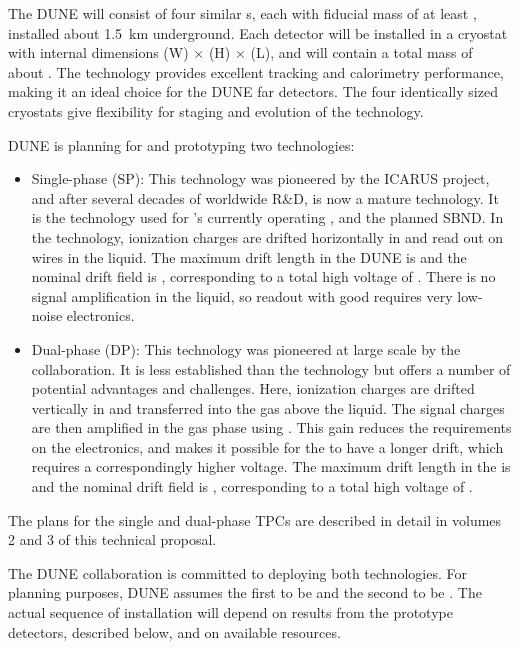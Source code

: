 The DUNE  will consist of four similar \lartpc{}s, each with fiducial mass of at least \nominalmodsize, installed about \SI{1.5}{km} underground. Each detector will be installed in a cryostat with internal dimensions
\cryostatwdth (W) $\times$ \cryostatht (H) $\times$ \cryostatlen (L), and will contain a total \lar{} mass of about \larmass{}.
The \lartpc technology provides
excellent tracking and calorimetry performance, making it an ideal
choice for the DUNE far detectors. The four identically sized cryostats give flexibility for staging and evolution of the \lartpc technology.

DUNE is planning for and prototyping two \lartpc technologies:
\begin{itemize}
\item Single-phase (SP): This technology was pioneered by the ICARUS project, and after several decades of worldwide R\&D, is now a mature technology. It is the technology used for \fnal{}'s currently operating \microboone, and the planned SBND. In the \single technology, ionization charges are drifted horizontally in \lar and read out on wires in the liquid. The maximum drift length in the DUNE  is \spmaxdrift and the nominal drift field is \spmaxfield, corresponding to a total high voltage of \sptargetdriftvoltpos. There is no signal amplification in the liquid, so readout with good  requires very low-noise electronics.

\item Dual-phase (DP): This technology was pioneered at large scale by the  collaboration. It is less established than the \single technology but offers a number of potential advantages and challenges. Here, ionization charges are drifted vertically in \lar and transferred into the gas above the liquid. The signal charges are then amplified in the gas phase using . This gain reduces the requirements on the electronics, and makes it possible for the  to have a longer drift, which requires a correspondingly higher voltage.
The maximum drift length in the  is \dpmaxdrift and the nominal drift field is \dpnominaldriftfield, corresponding to a total high voltage of \dptargetdriftvoltpos. 

\end{itemize}
The plans for the single and dual-phase TPCs are described in detail in volumes 2 and 3 of this technical proposal.

The DUNE collaboration is committed to deploying both technologies. 
For planning purposes, DUNE assumes the first  to be
\single and the second to be \dual.
The actual sequence of  installation will depend on results from the prototype detectors, described below, and on available resources.



